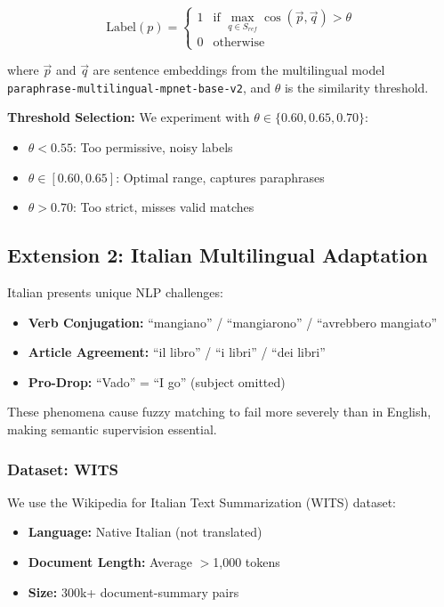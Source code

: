 \documentclass[conference]{IEEEtran}
\begin{document}
\begin{equation}
\text{Label}(p) = 
\begin{cases}
1 & \text{if } \max_{q \in S_{ref}} \cos(\vec{p}, \vec{q}) > \theta \\
0 & \text{otherwise}
\end{cases}
\label{eq:semantic}
\end{equation}

where $\vec{p}$ and $\vec{q}$ are sentence embeddings from the multilingual model \texttt{paraphrase-multilingual-mpnet-base-v2}, and $\theta$ is the similarity threshold.

\textbf{Threshold Selection:} We experiment with $\theta \in \{0.60, 0.65, 0.70\}$:
\begin{itemize}
    \item $\theta < 0.55$: Too permissive, noisy labels
    \item $\theta \in [0.60, 0.65]$: Optimal range, captures paraphrases
    \item $\theta > 0.70$: Too strict, misses valid matches
\end{itemize}

\subsection{Extension 2: Italian Multilingual Adaptation}
\label{sec:italian}

Italian presents unique NLP challenges:
\begin{itemize}
    \item \textbf{Verb Conjugation:} ``mangiano'' / ``mangiarono'' / ``avrebbero mangiato''
    \item \textbf{Article Agreement:} ``il libro'' / ``i libri'' / ``dei libri''
    \item \textbf{Pro-Drop:} ``Vado'' = ``I go'' (subject omitted)
\end{itemize}

These phenomena cause fuzzy matching to fail more severely than in English, making semantic supervision essential.

\subsubsection{Dataset: WITS}
We use the Wikipedia for Italian Text Summarization (WITS) dataset:
\begin{itemize}
    \item \textbf{Language:} Native Italian (not translated)
    \item \textbf{Document Length:} Average $>$1,000 tokens
    \item \textbf{Size:} 300k+ document-summary pairs
\end{itemize}
\end{document}
